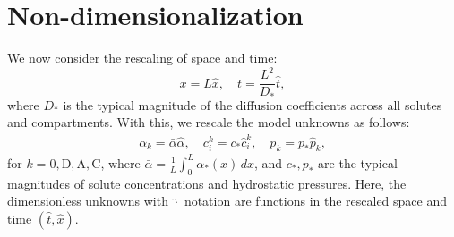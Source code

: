 \documentclass{article}
\begin{document}
\section{Non-dimensionalization}

We now consider the rescaling of space and time:
\begin{equation}
    x = L\hat{x},\quad t = \frac{L^2}{D_*}\hat{t},
\end{equation}
    where $D_*$ is the typical magnitude of the diffusion coefficients across all solutes and compartments.
With this, we rescale the model unknowns as follows:
\begin{gather}
    \alpha_k = \bar{\alpha}\hat{\alpha},\quad c_i^k = c_*\hat{c}_i^k,\quad p_k = p_*\hat{p}_k,
\end{gather}
    for $k=0,\mathrm{D},\mathrm{A},\mathrm{C}$, where $\bar{\alpha} = \frac{1}{L}\int_0^L\alpha_*(x)\,dx$, and $c_*,p_*$ are the typical magnitudes of solute concentrations and hydrostatic pressures.
Here, the dimensionless unknowns with $\hat{\cdot}$ notation are functions in the rescaled space and time $(\hat{t},\hat{x})$.
\end{document}
